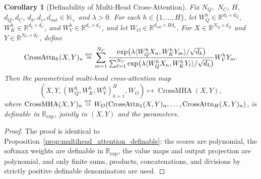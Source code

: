 \documentclass{article}
\newcommand{\eqdef}{\ensuremath{\stackrel{\mbox{\upshape\tiny def.}}{=}}}
\theoremstyle{plain}
\newtheorem{corollary}[theorem]{Corollary}
\theoremstyle{definition}
\theoremstyle{remark}
\theoremstyle{plain}
\numberwithin{thm}{section}
\theoremstyle{definition}
\numberwithin{equation}{section}
\begin{document}


\begin{corollary}[Definability of Multi-Head Cross-Attention]
\label{cor:multihead_cross_attention_definable}
Fix $N_Q,$ $N_C$, $H$, $d_Q,d_C$, $d_k,d_v,d_{out}\in\mathbb{N}_+$ and $\lambda>0$.  For
each $h\in\{1,\dots,H\}$, let
$W_Q^h\in\mathbb{R}^{d_k\times d_Q}$,
$W_K^h\in\mathbb{R}^{d_k\times d_C}$, and
$W_V^h\in\mathbb{R}^{d_v\times d_C}$, and let
$W_O\in\mathbb{R}^{d_{out}\times Hd_v}$.  For
$X\in\mathbb{R}^{N_Q\times d_Q}$ and
$Y\in\mathbb{R}^{N_C\times d_C}$, define
\[
    \operatorname{CrossAttn}_h(X,Y)_n
    \eqdef
    \sum_{m=1}^{N_C}
    \frac{
        \exp\!\big(\lambda\langle W_Q^hX_n,W_K^hY_m\rangle/\sqrt{d_k}\big)
    }{
        \sum_{\ell=1}^{N_C}
        \exp\!\big(\lambda\langle W_Q^hX_n,W_K^hY_\ell\rangle/\sqrt{d_k}\big)
    }
    W_V^hY_m .
\]
Then the parametrized multi-head cross-attention map
\[
    (X,Y,(W_Q^h,W_K^h,W_V^h)_{h=1}^H,W_O)
    \longmapsto
    \operatorname{CrossMHA}(X,Y),
\]
where
$\operatorname{CrossMHA}(X,Y)_n
\eqdef
W_O(\operatorname{CrossAttn}_1(X,Y)_n,\dots,\operatorname{CrossAttn}_H(X,Y)_n)$,
is definable in $\mathbb{R}_{\exp}$, jointly in $(X,Y)$ and the parameters.
\end{corollary}

\begin{proof}
The proof is identical to Proposition~\ref{prop:multihead_attention_definable}:
the scores are polynomial, the softmax weights are definable in
$\mathbb{R}_{\exp}$, the value maps and output projection are polynomial, and
only finite sums, products, concatenations, and divisions by strictly positive
definable denominators are used.
\end{proof}
\end{document}
